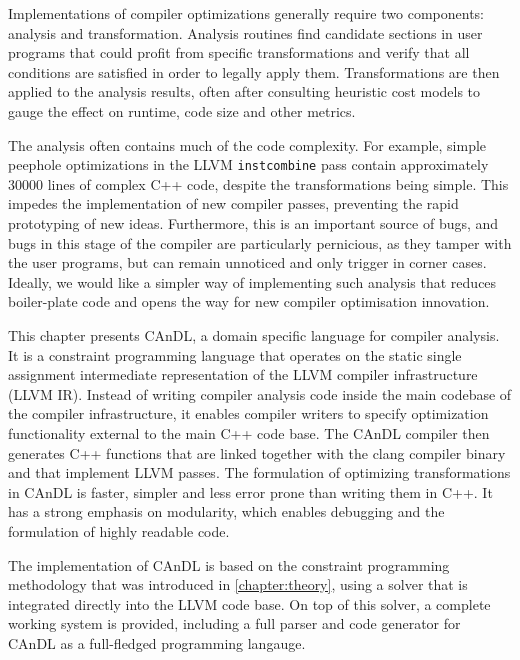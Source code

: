     Implementations of compiler optimizations generally require two components:
    analysis and transformation.
    Analysis routines find candidate sections in user programs that could profit
    from specific transformations and verify that all conditions are satisfied
    in order to legally apply them.
    Transformations are then applied to the analysis results, often after
    consulting heuristic cost models to gauge the effect on runtime, code size
    and other metrics.

    The analysis often contains much of the code complexity.
    For example, simple peephole optimizations in the LLVM {\tt instcombine}
    pass contain approximately 30000 lines of complex C++ code, despite the
    transformations being simple.
    This impedes the implementation of new compiler passes, preventing the rapid
    prototyping of new ideas.
    Furthermore, this is an important source of bugs, and bugs in this stage of
    the compiler are particularly pernicious, as they tamper with the user
    programs, but can remain unnoticed and only trigger in corner cases.
    Ideally, we would like a simpler way of implementing such analysis that
    reduces boiler-plate code and opens the way for new compiler optimisation
    innovation.

    This chapter presents CAnDL, a domain specific language for compiler
    analysis.
    It is a constraint programming language that operates on the static single
    assignment intermediate representation of the LLVM compiler infrastructure
    (LLVM IR).
    Instead of writing compiler analysis code inside the main codebase of the
    compiler infrastructure, it enables compiler writers to specify optimization
    functionality external to the main C++ code base.
    The CAnDL compiler then generates C++ functions that are linked together
    with the clang compiler binary and that implement LLVM passes.
    The formulation of optimizing transformations in CAnDL is faster, simpler
    and less error prone than writing them in C++.
    It has a strong emphasis on modularity, which enables debugging and the
    formulation of highly readable code.

    The implementation of CAnDL is based on the constraint programming
    methodology that was introduced in \autoref{chapter:theory}, using a solver
    that is integrated directly into the LLVM code base.
    On top of this solver, a complete working system is provided, including a
    full parser and code generator for CAnDL as a full-fledged programming
    langauge.

